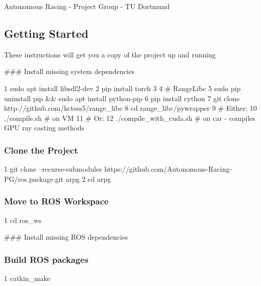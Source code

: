 Autonomous Racing -\/ Project Group -\/ TU Dortmund

\href{https://travis-ci.com/Autonomous-Racing-PG/ros.package}{\tt }

\subsection*{Getting Started}

These instructions will get you a copy of the project up and running

\#\#\# Install missing system dependencies 
\begin{DoxyCode}
1 sudo apt install libsdl2-dev
2 pip install torch
3 
4 # RangeLibc
5 sudo pip uninstall pip && sudo apt install python-pip
6 pip install cython
7 git clone http://github.com/kctess5/range\_libc
8 cd range\_libc/pywrapper
9 # Either:
10 ./compile.sh            # on VM
11 # Or:
12 ./compile\_with\_cuda.sh  # on car - compiles GPU ray casting methods
\end{DoxyCode}


\subsubsection*{Clone the Project}


\begin{DoxyCode}
1 git clone --recurse-submodules https://github.com/Autonomous-Racing-PG/ros.package.git arpg
2 cd arpg
\end{DoxyCode}


\subsubsection*{Move to R\+OS Workspace}


\begin{DoxyCode}
1 cd ros\_ws
\end{DoxyCode}


\#\#\# Install missing R\+OS dependencies 


\subsubsection*{Build R\+OS packages}


\begin{DoxyCode}
1 catkin\_make
\end{DoxyCode}


